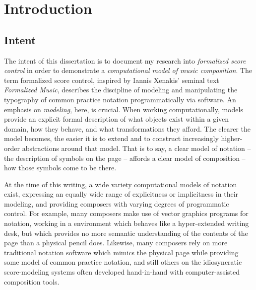\chapter{Introduction}
\label{chap:introduction}

\section{Intent}
\label{sec:intent}

The intent of this dissertation is to document my research into
\emph{formalized score control}\cite{ baca2011xi, baca2015tenor,
trevino2013compositional} in order to demonstrate a \emph{computational model
of music composition}. The term formalized score control, inspired by Iannis
Xenakis' seminal text \emph{Formalized Music}\cite{xenakis1992formalized,
baca2012}, describes the discipline of modeling and manipulating the typography
of common practice notation programmatically via software. An emphasis on
\emph{modeling}, here, is crucial. When working computationally, models provide
an explicit formal description of what objects exist within a given domain, how
they behave, and what transformations they afford. The clearer the model
becomes, the easier it is to extend and to construct increasingly higher-order
abstractions around that model. That is to say, a clear model of notation --
the description of symbols on the page -- affords a clear model of composition
-- how those symbols come to be there.

At the time of this writing, a wide variety computational models of notation
exist\cite{ baca2015tenor, trevino2013compositional, }, expressing an equally
wide range of explicitness or implicitness in their modeling, and providing
composers with varying degrees of programmatic control. For
example, many composers make use of vector graphics programs for notation,
working in a environment which behaves like a hyper-extended writing desk, but
which provides no more semantic understanding of the contents of the page than
a physical pencil does. Likewise, many composers rely on more traditional
notation software which mimics the physical page while providing some model of
common practice notation, and still others on the idiosyncratic score-modeling
systems often developed hand-in-hand with computer-assisted composition tools.

